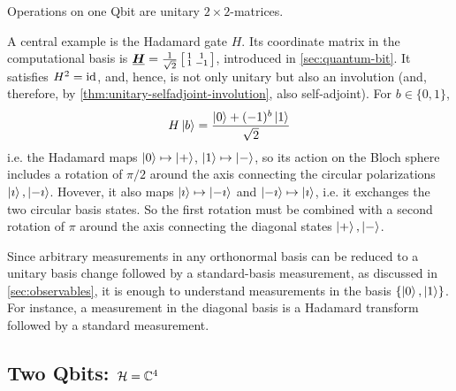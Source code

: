 


\medskip

Operations on one Qbit are unitary \(2\times2\)-matrices.
\begin{example}\label{ex:hadamard}
A central example is the Hadamard gate \(H\). Its coordinate matrix in the computational basis is
\(
\matr{H}
=
\smash[b]{
\frac{1}{\sqrt{2}}
}
\left[
\begin{smallmatrix}
1 & 1\\
1 & -1
\end{smallmatrix}
\right]
\), 
introduced in \autoref{sec:quantum-bit}.
It
satisfies
\(
H^2=\operatorname{id}
\),
and, hence, is not only unitary but also an involution (and, therefore, by \autoref{thm:unitary-selfadjoint-involution}, also self-adjoint).
For $b \in\{0,1\}$,
\[
H\ket{b}=\frac{{\ket{0}+(-1)^b\ket{1}}}{{\sqrt{2}}}
\]
i.e. the Hadamard maps
\(
\ket{0}
\mapsto
\ket{+}
\), 
\(
\ket{1}
\mapsto
\ket{-}
\), so its action on the Bloch sphere includes a rotation of $\pi/2$ around the axis connecting the circular polarizations $\ket{\imath}, \ket{-\imath}$.
Hovever, it also maps $\ket{\imath} \mapsto \ket{-\imath}$ and $\ket{-\imath} \mapsto \ket{\imath}$, i.e. it exchanges the two circular basis states.
So the first rotation must be combined with a second rotation of $\pi$ around the axis connecting the diagonal states $\ket{+}, \ket{-}$.
\end{example}

Since arbitrary measurements in any orthonormal basis can be reduced to a unitary basis change followed by a standard-basis measurement, as discussed in \autoref{sec:observables}, it is enough to understand measurements in the basis \(\{\ket{0},\ket{1}\}\).
For instance, a measurement in the diagonal basis is a Hadamard transform followed by a standard measurement.





\subsection{Two Qbits: $\mathcal{H} = \mathbb{C}^4$}


